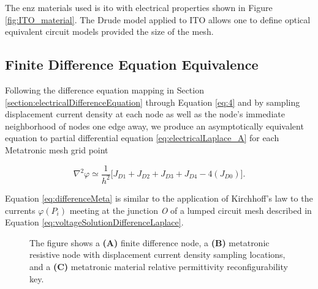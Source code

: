 \par The \acrshort{enz} materials used is \acrfull{ito} with electrical properties shown in Figure \ref{fig:ITO_material}. The \gls{Drude model} applied to ITO allows one to define optical equivalent circuit models provided the size of the mesh.

\subsection{Finite Difference Equation Equivalence}

\par Following the difference equation mapping in Section \ref{section:electricalDifferenceEquation} through Equation \ref{eq:4} and by sampling displacement current density at each node as well as the node's immediate neighborhood of nodes one edge away, we produce an asymptotically equivalent equation to partial differential equation \ref{eq:electricalLaplace_A} for each Metatronic mesh grid point

\begin{equation}\label{eq:differenceMeta}
  \nabla^2 \varphi \simeq 
  \frac{1}{h^2} \Big[ J_{D1} + J_{D2} +  J_{D3} +  J_{D4} - 4(J_{D0}) \Big].
\end{equation}

\par Equation \ref{eq:differenceMeta} is similar to the application of Kirchhoff's law to the currents $\varphi(P_i)$ meeting at the junction \textit{O} of a lumped circuit mesh described in Equation \ref{eq:voltageSolutionDifferenceLaplace}.

\begin{figure}[ht]
\centering{}
\caption{The figure shows a \textbf{(A)} finite difference node, a \textbf{(B)} metatronic resistive node with displacement current density sampling locations, and a \textbf{(C)} metatronic material relative permittivity reconfigurability key.}
\label{fig:metaNodeResistive}
\end{figure}

